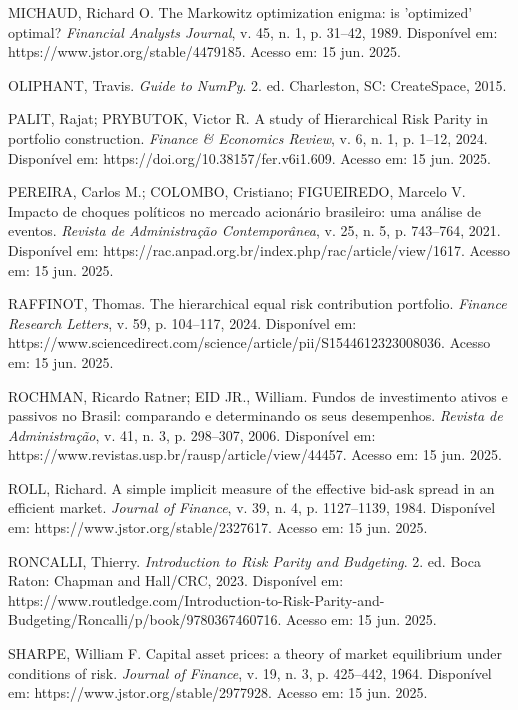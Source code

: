 \noindent
MICHAUD, Richard O. The Markowitz optimization enigma: is 'optimized' optimal? \textit{Financial Analysts Journal}, v. 45, n. 1, p. 31--42, 1989. Disponível em: https://www.jstor.org/stable/4479185. Acesso em: 15 jun. 2025.

\noindent
OLIPHANT, Travis. \textit{Guide to NumPy}. 2. ed. Charleston, SC: CreateSpace, 2015.

\noindent
PALIT, Rajat; PRYBUTOK, Victor R. A study of Hierarchical Risk Parity in portfolio construction. \textit{Finance \& Economics Review}, v. 6, n. 1, p. 1--12, 2024. Disponível em: https://doi.org/10.38157/fer.v6i1.609. Acesso em: 15 jun. 2025.

\noindent
PEREIRA, Carlos M.; COLOMBO, Cristiano; FIGUEIREDO, Marcelo V. Impacto de choques políticos no mercado acionário brasileiro: uma análise de eventos. \textit{Revista de Administração Contemporânea}, v. 25, n. 5, p. 743--764, 2021. Disponível em: https://rac.anpad.org.br/index.php/rac/article/view/1617. Acesso em: 15 jun. 2025.

\noindent
RAFFINOT, Thomas. The hierarchical equal risk contribution portfolio. \textit{Finance Research Letters}, v. 59, p. 104--117, 2024. Disponível em: https://www.sciencedirect.com/science/article/pii/S1544612323008036. Acesso em: 15 jun. 2025.

\noindent
ROCHMAN, Ricardo Ratner; EID JR., William. Fundos de investimento ativos e passivos no Brasil: comparando e determinando os seus desempenhos. \textit{Revista de Administração}, v. 41, n. 3, p. 298--307, 2006. Disponível em: https://www.revistas.usp.br/rausp/article/view/44457. Acesso em: 15 jun. 2025.

\noindent
ROLL, Richard. A simple implicit measure of the effective bid-ask spread in an efficient market. \textit{Journal of Finance}, v. 39, n. 4, p. 1127--1139, 1984. Disponível em: https://www.jstor.org/stable/2327617. Acesso em: 15 jun. 2025.

\noindent
RONCALLI, Thierry. \textit{Introduction to Risk Parity and Budgeting}. 2. ed. Boca Raton: Chapman and Hall/CRC, 2023. Disponível em: https://www.routledge.com/Introduction-to-Risk-Parity-and-Budgeting/Roncalli/p/book/9780367460716. Acesso em: 15 jun. 2025.

\noindent
SHARPE, William F. Capital asset prices: a theory of market equilibrium under conditions of risk. \textit{Journal of Finance}, v. 19, n. 3, p. 425--442, 1964. Disponível em: https://www.jstor.org/stable/2977928. Acesso em: 15 jun. 2025.


